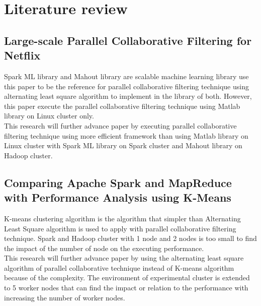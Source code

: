 \documentclass[conference]{IEEEtran}
\begin{document}

\section{Literature review}
\subsection{Large-scale Parallel Collaborative Filtering for Netflix}
Spark ML library and Mahout library are scalable machine learning library use this paper to be the reference for parallel collaborative filtering technique using alternating least square algorithm to implement in the library of both. However, this paper execute the parallel collaborative filtering technique using Matlab library on Linux cluster only. \\
\indent This research will further advance paper by executing parallel collaborative filtering technique using more efficient framework than using Matlab library on Linux cluster with Spark ML library on Spark cluster and Mahout library on Hadoop cluster. 

\subsection{Comparing Apache Spark and MapReduce with Performance Analysis using K-Means}
K-means clustering algorithm is the algorithm that simpler than Alternating Least Square algorithm is used to apply with parallel collaborative filtering technique. Spark and Hadoop cluster with 1 node and 2 nodes is too small to find the impact of the number of node on the executing performance. \\
\indent This research will further advance paper by using the alternating least square algorithm of parallel collaborative technique instead of K-means algorithm because of the complexity. The environment of experimental cluster is extended to 5 worker nodes that can find the impact or relation to the performance with increasing the number of worker nodes. 
\end{document}
